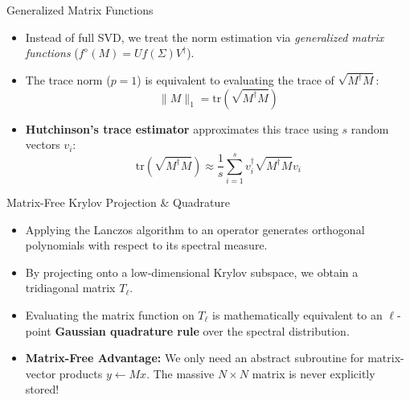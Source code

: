 \documentclass[aspectratio=169]{beamer}
\begin{document}
\begin{frame}{Generalized Matrix Functions}
  \begin{itemize}
    \item Instead of full SVD, we treat the norm estimation via \textit{generalized matrix functions} ($f^\diamond(M) = U f(\Sigma) V^\dagger$).
    \item The trace norm ($p=1$) is equivalent to evaluating the trace of $\sqrt{M^\dagger M}$:
      \begin{equation*}
        \|M\|_1 = \mathrm{tr}\left( \sqrt{M^\dagger M} \right)
      \end{equation*}
    \item \textbf{Hutchinson's trace estimator} approximates this trace using $s$ random vectors $v_i$:
      \begin{equation*}
        \mathrm{tr}\left( \sqrt{M^\dagger M} \right) \approx \frac{1}{s} \sum_{i=1}^s v_i^\dagger \sqrt{M^\dagger M} v_i
      \end{equation*}
  \end{itemize}
\end{frame}

\begin{frame}{Matrix-Free Krylov Projection \& Quadrature}
  \begin{itemize}
    \item Applying the Lanczos algorithm to an operator generates orthogonal polynomials with respect to its spectral measure.
    \item By projecting onto a low-dimensional Krylov subspace, we obtain a tridiagonal matrix $T_\ell$.
    \item Evaluating the matrix function on $T_\ell$ is mathematically equivalent to an $\ell$-point \textbf{Gaussian quadrature rule} over the spectral distribution.
    \item \textbf{Matrix-Free Advantage:} We only need an abstract subroutine for matrix-vector products $y \leftarrow M x$. The massive $N \times N$ matrix is never explicitly stored!
  \end{itemize}
\end{frame}
\end{document}
